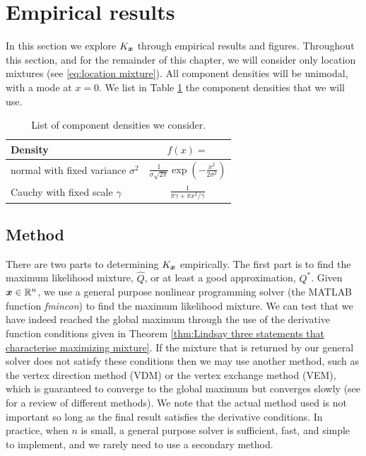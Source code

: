 \section{Empirical results}
\label{sec:empirical results}
	In this section we explore $K_{\bm{{x}}}$ through empirical results and figures. Throughout this section, and for the remainder of this chapter, we will consider only location mixtures (see \eqref{eq:location mixture}). All component densities will be unimodal, with a mode at $x = 0$. We list in Table \ref{tab:component densities} the component densities that we will use.

	\begin{table}[ht]
	\centering
		\begin{tabular}{l | c}
			Density & $f(x) = $\\
			\hline
			normal with fixed variance $\sigma^2$ & $\frac{1}{\sigma \sqrt{2 \pi}} \exp\left(-\frac{x^2}{2\sigma^2}\right) $\\
			Cauchy with fixed scale $\gamma$ & $\frac{1}{\pi \gamma + \pi x^2/\gamma}$
		\end{tabular}	
		\caption{List of component densities we consider.}
		\label{tab:component densities}
	\end{table}
	

	\subsection{Method}
	There are two parts to determining $K_{\bm{{x}}}$ empirically. The first part is to find the maximum likelihood mixture, $\hat{Q}$, or at least a good approximation, $Q^*$. Given ${\bm{{x}}} \in \mathbb{R}^n$, we use a general purpose nonlinear programming solver (the MATLAB function \emph{fmincon}) to find the maximum likelihood mixture. We can test that we have indeed reached the global maximum through the use of the derivative function conditions given in Theorem \ref{thm:Lindsay three statements that characterise maximizing mixture}. If the mixture that is returned by our general solver does not satisfy these conditions then we may use another method, such as the vertex direction method (VDM) or the vertex exchange method (VEM), which is guaranteed to converge to the global maximum but converges slowly (see \cite{Bohning1995-di} for a review of different methods). We note that the actual method used is not important so long as the final result satisfies the derivative conditions. In practice, when $n$ is small, a general purpose solver is sufficient, fast, and simple to implement, and we rarely need to use a secondary method.

